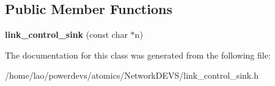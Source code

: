\subsection*{Public Member Functions}
\begin{DoxyCompactItemize}
\item 
{\bfseries link\+\_\+control\+\_\+sink} (const char $\ast$n)\hypertarget{classlink__control__sink_aaacf4e3b053a0b5c905199aa377ae59d}{}\label{classlink__control__sink_aaacf4e3b053a0b5c905199aa377ae59d}

\end{DoxyCompactItemize}


The documentation for this class was generated from the following file\+:\begin{DoxyCompactItemize}
\item 
/home/lao/powerdevs/atomics/\+Network\+D\+E\+V\+S/link\+\_\+control\+\_\+sink.\+h\end{DoxyCompactItemize}
